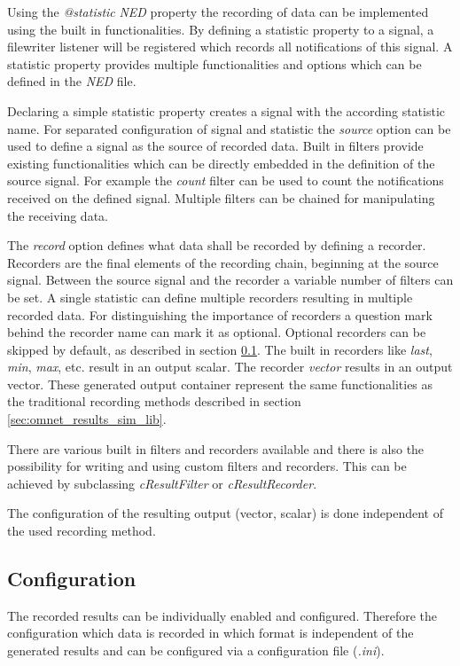 Using the \emph{@statistic} \emph{NED} property the recording of data can be implemented using the built in functionalities.
By defining a statistic property to a signal, a filewriter listener will be registered which records all notifications of this signal.
A statistic property provides multiple functionalities and options which can be defined in the \emph{NED} file.

Declaring a simple statistic property creates a signal with the according statistic name.
For separated configuration of signal and statistic the \emph{source} option can be used to define a signal as the source of recorded data.
Built in filters provide existing functionalities which can be directly embedded in the definition of the source signal.
For example the \emph{count} filter can be used to count the notifications received on the defined signal.
Multiple filters can be chained for manipulating the receiving data.

The \emph{record} option defines what data shall be recorded by defining a recorder.
Recorders are the final elements of the recording chain, beginning at the source signal.
Between the source signal and the recorder a variable number of filters can be set.
A single statistic can define multiple recorders resulting in multiple recorded data.
For distinguishing the importance of recorders a question mark behind the recorder name can mark it as optional.
Optional recorders can be skipped by default, as described in section \ref{sec:omnet_results_config}.
The built in recorders like \emph{last}, \emph{min}, \emph{max}, etc. result in an output scalar.
The recorder \emph{vector} results in an output vector.
These generated output container represent the same functionalities as the traditional recording methods described in section \ref{sec:omnet_results_sim_lib}.

There are various built in filters and recorders available \cite[section 4.15.2]{omnet_manual} and there is also the possibility for writing and using custom filters and recorders. 
This can be achieved by subclassing \emph{cResultFilter} or \emph{cResultRecorder}. \cite[section 4.15.6]{omnet_manual}

The configuration of the resulting output (vector, scalar) is done independent of the used recording method.

\subsection{Configuration}
\label{sec:omnet_results_config}
The recorded results can be individually enabled and configured.
Therefore the configuration which data is recorded in which format is independent of the generated results and can be configured via a configuration file (\emph{.ini}).

